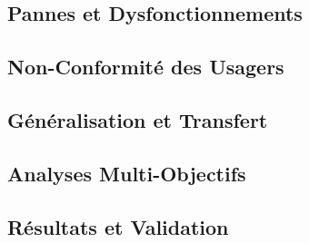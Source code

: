 \subsection{Pannes et Dysfonctionnements}
\label{subsec:pannes_dysfonctionnements}

\subsection{Non-Conformité des Usagers}
\label{subsec:non_conformite_usagers}

\subsection{Généralisation et Transfert}
\label{subsec:generalisation_transfert}

\subsection{Analyses Multi-Objectifs}
\label{subsec:analyses_multi_objectifs}

\subsection{Résultats et Validation}
\label{subsec:resultats_scenarios}

